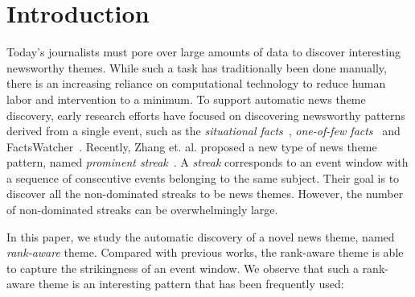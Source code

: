 
\section{Introduction}
Today's journalists must pore over large amounts of data to discover interesting
newsworthy themes. While such a task has traditionally been done manually,
there is an increasing reliance on computational technology to reduce human
labor and intervention to a minimum.
To support automatic news theme discovery, early research efforts have focused on discovering newsworthy patterns derived 
from a single event, such as the \emph{situational facts}~\cite{sultana2014incremental}, 
\emph{one-of-few facts}~\cite{wu2012one} and FactsWatcher~\cite{hassan2014data}.
Recently, Zhang et. al. proposed a new type of news theme pattern, named \emph{prominent streak}~\cite{zhang2014discovering}.
A \emph{streak} corresponds to an event window with a sequence of consecutive events belonging to the same subject. Their goal is to discover all the non-dominated streaks to be news themes. However, the number of non-dominated streaks can be overwhelmingly large.

In this paper, we study the automatic discovery of a novel news theme, named \emph{rank-aware} theme. Compared with previous works, 
the rank-aware theme is able to capture the strikingness of an event window. We observe that such a rank-aware theme is an interesting pattern that has been frequently used:



